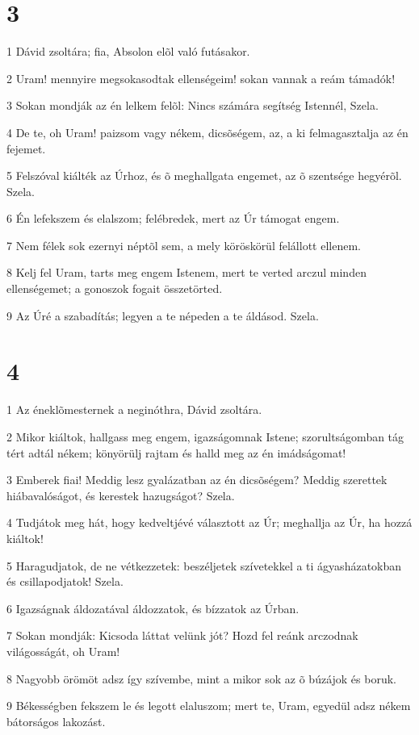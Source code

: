 \chapter{3}

\par 1 Dávid zsoltára; fia, Absolon elõl való futásakor.
\par 2 Uram! mennyire megsokasodtak ellenségeim! sokan vannak a reám támadók!
\par 3 Sokan mondják az én lelkem felõl: Nincs számára segítség Istennél, Szela.
\par 4 De te, oh Uram! paizsom vagy nékem, dicsõségem, az, a ki felmagasztalja az én fejemet.
\par 5 Felszóval kiálték az Úrhoz, és õ meghallgata engemet, az õ szentsége hegyérõl. Szela.
\par 6 Én lefekszem és elalszom; felébredek, mert az Úr támogat engem.
\par 7 Nem félek sok ezernyi néptõl sem, a mely köröskörül felállott ellenem.
\par 8 Kelj fel Uram, tarts meg engem Istenem, mert te verted arczul minden ellenségemet; a gonoszok fogait összetörted.
\par 9 Az Úré a szabadítás; legyen a te népeden a te áldásod. Szela.

\chapter{4}

\par 1 Az éneklõmesternek a neginóthra, Dávid zsoltára.
\par 2 Mikor kiáltok, hallgass meg engem, igazságomnak Istene; szorultságomban tág tért adtál nékem; könyörülj rajtam és halld meg az én imádságomat!
\par 3 Emberek fiai! Meddig lesz gyalázatban az én dicsõségem? Meddig szerettek hiábavalóságot, és kerestek hazugságot? Szela.
\par 4 Tudjátok meg hát, hogy kedveltjévé választott az Úr; meghallja az Úr, ha hozzá kiáltok!
\par 5 Haragudjatok, de ne vétkezzetek: beszéljetek szívetekkel a ti ágyasházatokban és csillapodjatok! Szela.
\par 6 Igazságnak áldozatával áldozzatok, és bízzatok az Úrban.
\par 7 Sokan mondják: Kicsoda láttat velünk jót? Hozd fel reánk arczodnak világosságát, oh Uram!
\par 8 Nagyobb örömöt adsz így szívembe, mint a mikor sok az õ búzájok és boruk.
\par 9 Békességben fekszem le és legott elaluszom; mert te, Uram, egyedül adsz nékem bátorságos lakozást.

